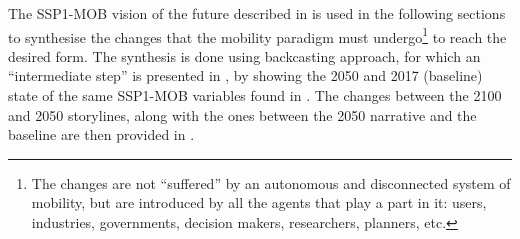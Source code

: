 The SSP1-MOB vision of the future described in  is used in the following sections to synthesise the changes that the mobility paradigm must undergo\footnote{The changes are not ``suffered'' by an autonomous and disconnected system of mobility, but are introduced by all the agents that play a part in it: users, industries, governments, decision makers, researchers, planners, etc.} to reach the desired form. The synthesis is done using backcasting approach, for which an ``intermediate step'' is presented in , by showing the 2050 and 2017 (baseline) state of the same SSP1-MOB variables found in . The changes between the 2100 and 2050 storylines, along with the ones between the 2050 narrative and the baseline are then provided in .

